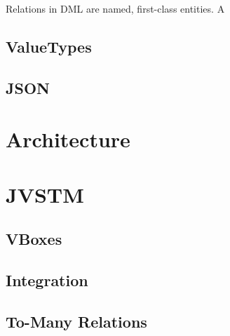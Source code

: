 Relations in DML are named, first-class entities. A 
 

\subsection{ValueTypes}
\subsection{JSON}


\section{Architecture}
\label{sec:ff-arch}


\section{JVSTM}
\label{sec:jvstm}

\subsection{VBoxes}

\subsection{Integration}

\subsection{To-Many Relations}


